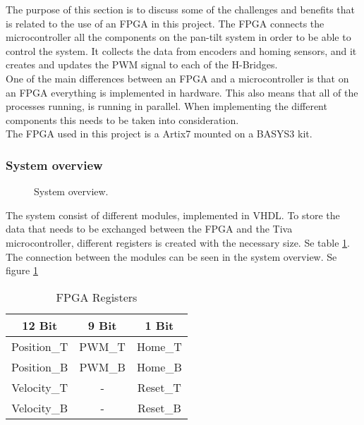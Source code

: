 \documentclass[../../../main]{subfiles}
\begin{document}
The purpose of this section is to discuss some of the challenges and benefits that is related to the use of an FPGA in this project.
The FPGA connects the  microcontroller all the components on the pan-tilt system in order to be able to control the system. It collects the data from encoders and homing sensors, and it creates and updates the PWM signal to each of the H-Bridges.
\\
One of the main differences between an FPGA and a microcontroller is that on an FPGA everything is implemented in hardware. This also means that all of the processes running, is running in parallel. When implementing the different components this needs to be taken into consideration.
\\
The FPGA used in this project is a Artix7 mounted on a BASYS3 kit. 
\subsubsection{System overview}%
\label{sub:system_overview}

\begin{figure}[H]
  \centering
  \def\svgwidth{\textwidth}
  
  \caption{System overview.}
  \label{fig:FPGA_system_overview}
\end{figure}

The system consist of different modules, implemented in VHDL.
To store the data that needs to be exchanged between the FPGA and the Tiva microcontroller, different registers is created with the necessary size. Se table \ref{table:FPGA_registers}.
\\
The connection between the modules can be seen in the system overview. Se figure \ref{fig:FPGA_system_overview}
\begin{table}[H]
\begin{tabular}{|c|c|c|}
\hline
\textbf{12 Bit} & \textbf{9 Bit} & \textbf{1 Bit} \\ \hline
Position\_T     & PWM\_T         & Home\_T        \\ \hline
Position\_B     & PWM\_B         & Home\_B        \\ \hline
Velocity\_T     & -              & Reset\_T       \\ \hline
Velocity\_B     & -              & Reset\_B       \\ \hline
\end{tabular}
\caption{FPGA Registers}
\label{table:FPGA_registers}
\end{table}
\end{document}
